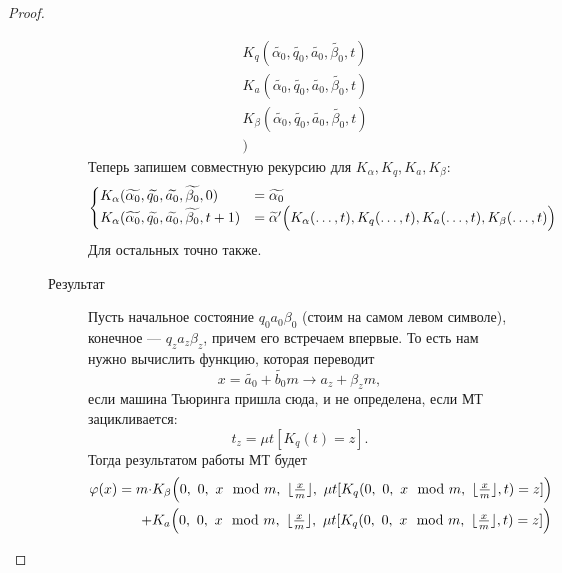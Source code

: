 \begin{proof}
\begin{description}
\begin{description}
\[\begin{aligned}
			 &K_{ q }(\widetilde{ \alpha_0} , \widetilde{ q_0} , \widetilde{ a_0}, \widetilde{ \beta_0}, t) \\ 
			 &K_{ a }(\widetilde{ \alpha_0} , \widetilde{ q_0} , \widetilde{ a_0}, \widetilde{ \beta_0}, t) \\ 
			 &K_{ \beta  }(\widetilde{ \alpha_0} , \widetilde{ q_0} , \widetilde{ a_0}, \widetilde{ \beta_0}, t) \\ 
			 &)
	\end{aligned}
	\]
	Теперь запишем совместную рекурсию для $ K_{ \alpha }, K_{ q}, K_{a}, K_{ \beta }$:
	\[
	\begin{aligned}
		\begin{cases}
			K_{ \alpha }(\widetilde{ \alpha _0} , \widetilde{ q_0} , \widetilde{ a_0} , \widetilde{ \beta _0} , 0) &= \widetilde{ \alpha _0} \\
			K_{ \alpha }(\widetilde{ \alpha _0} , \widetilde{ q_0} , \widetilde{ a_0} , \widetilde{ \beta _0} , t+1) &= \widetilde{ \alpha } ' \Bigl(  
				K_{ \alpha }( \ldots , t), K_{q} (\ldots , t), K_{a} (\ldots , t) , K_{ \beta }(\ldots , t)
			\Bigr)
		\end{cases}
	\end{aligned}
	\]
	Для остальных точно также.

\item[Результат] 
	Пусть начальное состояние $ q_0 a_0 \beta_0$ (стоим на самом левом символе), конечное  --- $ q_{z} a_{z} \beta _{z}$, причем его встречаем впервые. 
	То есть нам нужно вычислить функцию, которая переводит 
	$$ x = \widetilde{ a_0} + \widetilde{ b_0} m \longrightarrow a_z + \beta _z m,$$
	если машина Тьюринга пришла сюда, и не определена, если МТ зацикливается:
	\[
		t_z = \mu t[K_{q}(t) = z]
	.\] 
	Тогда результатом работы МТ будет
	\[
	\begin{aligned}
		\varphi (x) = m \cdot  &K _{\beta} \Bigl(0, ~0, ~x \mod m, ~\lfloor \tfrac{x}{m} \rfloor, ~\mu t[K_{q}(0, ~0, ~x \mod m, ~\lfloor \tfrac{x}{m} \rfloor, t) = z]\Bigr)\\
		+ &K_{a}\Bigl(0, ~0, ~x \mod m, ~\lfloor \tfrac{x}{m} \rfloor, ~\mu t[K_{q}(0, ~0, ~x \mod m, ~\lfloor \tfrac{x}{m} \rfloor, t) = z ]\Bigr)
	\end{aligned}
	\]
			\end{description}
    \end{description} 
\end{proof}

